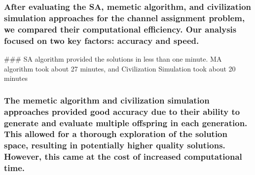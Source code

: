 \documentclass[11pt]{article}
\begin{document}
\hypertarget{after-evaluating-the-sa-memetic-algorithm-and-civilization-simulation-approaches-for-the-channel-assignment-problem-we-compared-their-computational-efficiency.-our-analysis-focused-on-two-key-factors-accuracy-and-speed.}{%
\subsubsection{\texorpdfstring{ After evaluating the SA, memetic
algorithm, and civilization simulation approaches for the channel
assignment problem, we compared their computational efficiency. Our
analysis focused on two key factors: accuracy and
speed.}{ After evaluating the SA, memetic algorithm, and civilization simulation approaches for the channel assignment problem, we compared their computational efficiency. Our analysis focused on two key factors: accuracy and speed.}}\label{after-evaluating-the-sa-memetic-algorithm-and-civilization-simulation-approaches-for-the-channel-assignment-problem-we-compared-their-computational-efficiency.-our-analysis-focused-on-two-key-factors-accuracy-and-speed.}}

\#\#\# SA algorithm provided the solutions in less than one minute. MA
algorithm took about 27 minutes, and Civilization Simulation took about
20 minutes

\hypertarget{the-memetic-algorithm-and-civilization-simulation-approaches-provided-good-accuracy-due-to-their-ability-to-generate-and-evaluate-multiple-offspring-in-each-generation.-this-allowed-for-a-thorough-exploration-of-the-solution-space-resulting-in-potentially-higher-quality-solutions.-however-this-came-at-the-cost-of-increased-computational-time.}{%
\subsubsection{\texorpdfstring{ The memetic algorithm and civilization
simulation approaches provided good accuracy due to their ability to
generate and evaluate multiple offspring in each generation. This
allowed for a thorough exploration of the solution space, resulting in
potentially higher quality solutions. However, this came at the cost of
increased computational
time.}{ The memetic algorithm and civilization simulation approaches provided good accuracy due to their ability to generate and evaluate multiple offspring in each generation. This allowed for a thorough exploration of the solution space, resulting in potentially higher quality solutions. However, this came at the cost of increased computational time.}}\label{the-memetic-algorithm-and-civilization-simulation-approaches-provided-good-accuracy-due-to-their-ability-to-generate-and-evaluate-multiple-offspring-in-each-generation.-this-allowed-for-a-thorough-exploration-of-the-solution-space-resulting-in-potentially-higher-quality-solutions.-however-this-came-at-the-cost-of-increased-computational-time.}}
\end{document}
